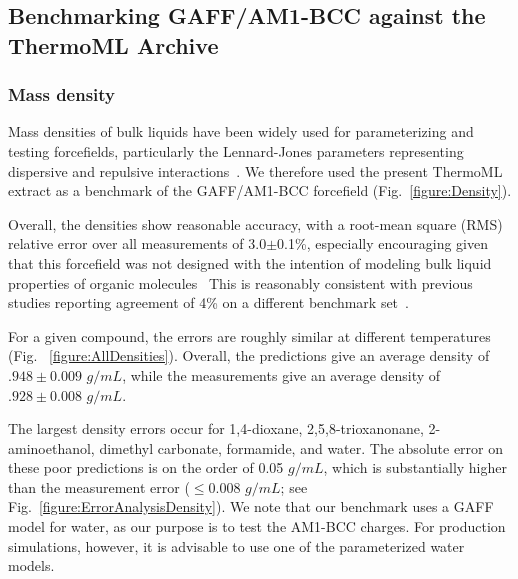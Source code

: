 \documentclass[aps,pre,twocolumn,nofootinbib,superscriptaddress,linenumbers]{revtex4-1}
\begin{document}

\subsection{Benchmarking GAFF/AM1-BCC against the ThermoML Archive}

\subsubsection{Mass density}

Mass densities of bulk liquids have been widely used for parameterizing and testing forcefields, particularly the Lennard-Jones parameters representing dispersive and repulsive interactions~\cite{jorgensen1983comparison, jorgensen1984optimized}.
We therefore used the present ThermoML extract as a benchmark of the GAFF/AM1-BCC forcefield (Fig.~\ref{figure:Density}).  

Overall, the densities show reasonable accuracy, with a root-mean square (RMS) relative error over all measurements of 3.0$\pm$0.1\%, especially encouraging given that this forcefield was not designed with the intention of modeling bulk liquid properties of organic molecules~\cite{gaff,gaff2}
This is reasonably consistent with previous studies reporting agreement of 4\% on a different benchmark set~\cite{caleman2011force}.

For a given compound, the errors are roughly similar at different temperatures (Fig. ~\ref{figure:AllDensities}).  Overall, the predictions give an average density of $.948 \pm 0.009$ $g / mL$, while the measurements give an average density of $.928 \pm 0.008$ $g / mL$.  

The largest density errors occur for 1,4-dioxane, 2,5,8-trioxanonane, 2-aminoethanol, dimethyl carbonate, formamide, and water.  The absolute error on these poor predictions is on the order of 0.05 $g / mL$, which is substantially higher than the measurement error ($\le 0.008$ $g / mL$; see Fig.~\ref{figure:ErrorAnalysisDensity}).  We note that our benchmark uses a GAFF model for water, as our purpose is to test the AM1-BCC charges.  For production simulations, however, it is advisable to use one of the parameterized water models.  


\end{document}
